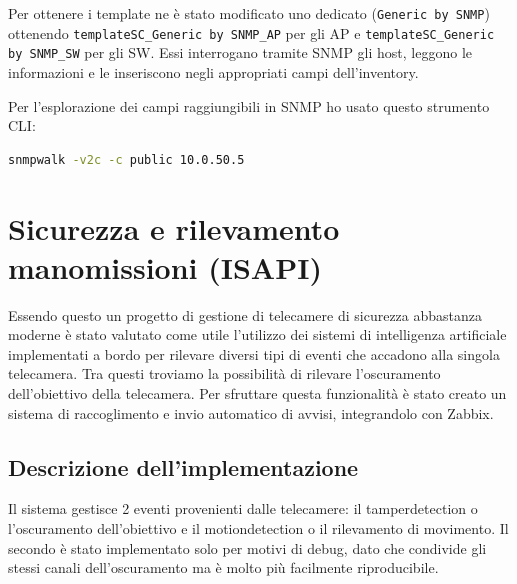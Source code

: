 \documentclass[12pt, a4paper]{report}
\begin{document}
Per ottenere i template ne è stato modificato uno dedicato (\lstinline|Generic by SNMP|) ottenendo
\lstinline|templateSC_Generic by SNMP_AP| per gli AP e \lstinline|templateSC_Generic by SNMP_SW| per gli SW. 
Essi interrogano tramite SNMP gli host, leggono le informazioni e le inseriscono negli appropriati campi dell'inventory.

Per l'esplorazione dei campi raggiungibili in SNMP ho usato questo strumento CLI:

\begin{lstlisting}[language=bash, caption=Esempio di discovery manuale dei MIB via CLI]
snmpwalk -v2c -c public 10.0.50.5 
\end{lstlisting}

\chapter{Sicurezza e rilevamento manomissioni (ISAPI)}

Essendo questo un progetto di gestione di telecamere di sicurezza abbastanza moderne è stato valutato come utile l'utilizzo dei sistemi di 
intelligenza artificiale implementati a bordo per rilevare diversi tipi di eventi che accadono alla singola telecamera.
Tra questi troviamo la possibilità di rilevare l'oscuramento dell'obiettivo della telecamera. 
Per sfruttare questa funzionalità è stato creato un sistema di raccoglimento e invio automatico di avvisi, integrandolo con Zabbix.

\section{Descrizione dell'implementazione}
Il sistema gestisce 2 eventi provenienti dalle telecamere: il  tamperdetection o l'oscuramento dell'obiettivo e il motiondetection o il rilevamento di movimento. 
Il secondo è stato implementato solo per motivi di debug, dato che condivide gli stessi canali dell'oscuramento ma è molto più facilmente riproducibile.
\end{document}
